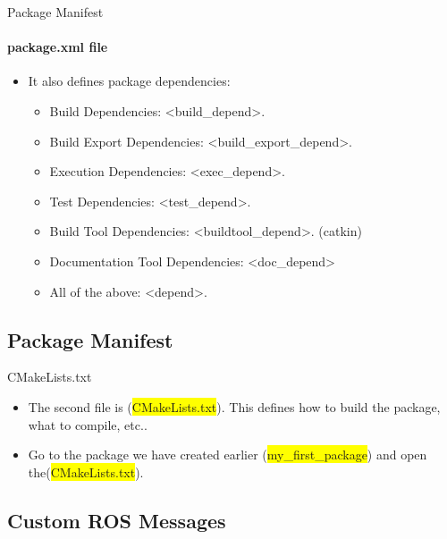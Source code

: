\documentclass{beamer}
\begin{document}
   \begin{frame}{Package Manifest}
       \framesubtitle{package.xml file}    
    \begin{itemize}
        \item It also defines package dependencies:
        \begin{itemize}
            \item  Build Dependencies: {\color{red}<build\_depend>}.
            \item Build Export Dependencies: {\color{red}<build\_export\_depend>}.
            \item Execution Dependencies: {\color{red}<exec\_depend>}.
            \item Test Dependencies: {\color{red}<test\_depend>}.
            \item Build Tool Dependencies: {\color{red}<buildtool\_depend>}. (catkin)
            \item Documentation Tool Dependencies: {\color{red}<doc\_depend>}
            \item All of the above: {\color{red}<depend>}.
        \end{itemize}
    \end{itemize}
    
\end{frame}




\subsection{Package Manifest}

\begin{frame}{CMakeLists.txt}
    
    \begin{itemize}
        \item The second file is ({\ttfamily \colorbox{yellow}{CMakeLists.txt}}). This defines how to build the package, what to compile, etc..
        \item Go to the package we have created earlier ({\ttfamily \colorbox{yellow}{my\_first\_package}}) and open the({\ttfamily \colorbox{yellow}{CMakeLists.txt}}).
    \end{itemize}
\end{frame}




\subsection{Custom ROS Messages}
\end{document}

